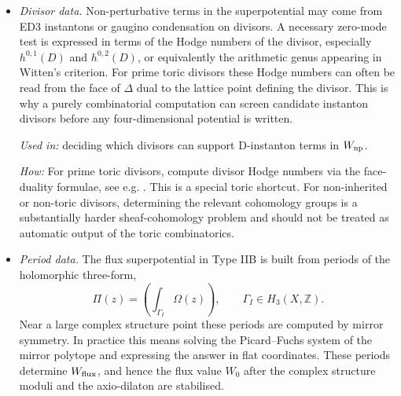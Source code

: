 \begin{itemize}[leftmargin=*]
    \par\smallskip
    \noindent\emph{Used in:} the domain of validity of the large-volume
    expansion, the definition of K\"ahler chambers, and the geometric
    transitions used in the Lecture~3 search strategy.

    \par\noindent\emph{How:} \texttt{CYTools} computes Mori and K\"ahler cone data
    for toric phases and tracks the classical data across
    triangulations \cite{Demirtas:2022hqf}.  The secondary-fan and
    chamber-navigation layer used in the separate Lecture~3 and 4 discussion
    is provided by \texttt{fanroots} \cite{fanroots:code}.

    \item \emph{Divisor data.}
    Non-perturbative terms in the superpotential may come from ED3
    instantons or gaugino condensation on divisors. A necessary
    zero-mode test is expressed in terms of the Hodge numbers of the
    divisor, especially $h^{0,1}(D)$ and $h^{0,2}(D)$, or
    equivalently the arithmetic genus appearing in Witten's criterion.
    For prime toric divisors these Hodge numbers can often be read
    from the face of $\Delta$ dual to the lattice point defining
    the divisor. This is why a purely combinatorial computation can
    screen candidate instanton divisors before any four-dimensional
    potential is written.

    \par\smallskip
    \noindent\emph{Used in:} deciding which divisors can support D-instanton terms in $W_{\rm np}$.

    \par\noindent\emph{How:} For prime toric divisors,
    compute divisor Hodge numbers via the face-duality formulae, see e.g.
    \cite{Braun:2017nhi}.  This is a special toric shortcut.  For
    non-inherited or non-toric divisors, determining the relevant
    cohomology groups is a substantially harder sheaf-cohomology
    problem and should not be treated as automatic output of the
    toric combinatorics.

    \item \emph{Period data.}
    The flux superpotential in Type IIB is built from periods of the
    holomorphic three-form,
    \begin{equation}
        \Pi(z)=\left(\int_{\Gamma_I}\Omega(z)\right),
        \qquad \Gamma_I\in H_3(X,\mathbb{Z}) .
    \end{equation}
    Near a large complex structure point these periods are computed
    by mirror symmetry. In practice this means solving the
    Picard--Fuchs system of the mirror polytope and expressing the
    answer in flat coordinates. These periods determine
    $W_{\rm flux}$, and hence the flux value $W_0$ after the
    complex structure moduli and the axio-dilaton are stabilised.


\end{itemize}
